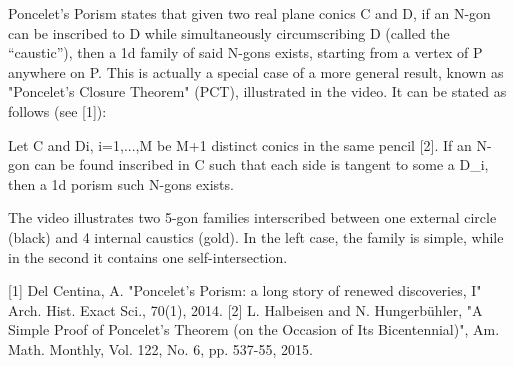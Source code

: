 Poncelet's Porism states that given two real plane conics C and D, if an N-gon can be inscribed to D while simultaneously circumscribing D (called the ``caustic''), then a 1d family of said N-gons exists, starting from a vertex of P anywhere on P. This is actually a special case of a more general result,  known as "Poncelet's Closure Theorem" (PCT), illustrated in the video. It can be stated as follows (see [1]): 

 Let C and Di, i=1,...,M be M+1 distinct conics in the same pencil [2]. If an N-gon can be found inscribed in C such that each side is tangent to some a D_i, then a 1d porism such N-gons exists.

The video illustrates two 5-gon families interscribed between one external circle (black) and 4 internal caustics (gold). In the left case, the family is simple, while in the second it contains one self-intersection.

[1] Del Centina, A. "Poncelet's Porism: a long story of renewed discoveries, I" Arch. Hist. Exact Sci., 70(1), 2014.
[2] L. Halbeisen and N. Hungerbühler, "A Simple Proof of Poncelet's Theorem (on the Occasion of Its Bicentennial)", Am. Math. Monthly, 
Vol. 122, No. 6, pp. 537-55, 2015.